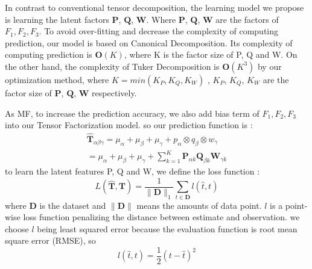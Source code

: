 In contrast to conventional tensor decomposition, the learning model we propose is learning the latent factors $\mathbf{P}$,  $\mathbf{Q}$, $\mathbf{W}$.
Where $\mathbf{P}$,  $\mathbf{Q}$, $\mathbf{W}$ are the factors of $F_1, F_2, F_3$.
To avoid over-fitting and decrease the complexity of computing prediction, our model is based on Canonical Decomposition.
Its complexity of computing prediction is $\mathbf{O}(K)$, where K is the factor size of  P, Q and W.
On the other hand, the complexity of Tuker Decomposition is $\mathbf{O}(K^3)$  by our optimization method,
where $ K=min(K_P,K_Q,K_W) $ , $K_P$, $K_Q$, $ K_W$ are the factor size of $\mathbf{P}$,  $\mathbf{Q}$, $\mathbf{W}$ respectively.

As MF, to increase the prediction accuracy, we also add bias term of $F_1, F_2, F_3$ into our Tensor Factorization model.
so our prediction function is :
\begin{equation*}
\begin{aligned}
\mathbf{\hat{T}}_{\alpha\beta\gamma}=\mu_\alpha+\mu_\beta+\mu_\gamma+p_\alpha \otimes q_\beta\otimes  w_\gamma
\\=\mu_\alpha+\mu_\beta+\mu_\gamma+\sum\limits_{k=1}^{K}\mathbf{P}_{\alpha k} \mathbf{Q}_{\beta k} \mathbf{W}_{\gamma k}
\end{aligned}
\end{equation*}
to learn the latent features P, Q and W, we define the loss function :
\begin{equation*}
L(\mathbf{\hat{T}},\mathbf{T})=\frac{1}{\|\mathbf{D}\|_1} \sum\limits_{t\in \mathbf{D}}  l(\hat{t},t)
\end{equation*}
where $\mathbf{D}$ is the dataset and $\|\mathbf{D}\|$ means the amounts of data point.
$l$ is a point-wise loss function penalizing the distance between estimate and observation.
we choose $l$ being least squared error because the evaluation function is root mean square error (RMSE), so
\begin{equation*}
l(\hat{t},t)=\frac{1}{2}(t-\hat{t})^2
\end{equation*}

